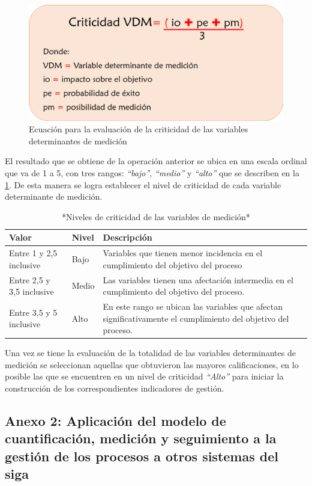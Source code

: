 \documentclass[
]{book}
\begin{document}
\begin{figure}

{\centering \includegraphics[width=0.6\linewidth]{Imagenes/texto_10} 

}

\caption{Ecuación para la evaluación de la criticidad de las variables determinantes de medición}\label{fig:texto10}
\end{figure}

El resultado que se obtiene de la operación anterior se ubica en una escala ordinal que va de 1 a 5, con tres rangos: \emph{``bajo''}, \emph{``medio''} y \emph{``alto''} que se describen en la \ref{tab:tablaD}. De esta manera se logra establecer el nivel de criticidad de cada variable determinante de medición.

\begin{table}

\caption{\label{tab:tablaD}*Niveles de criticidad de las variables de medición*}
\centering
\begin{tabular}[t]{l|l|l}
\hline
Valor & Nivel & Descripción\\
\hline
Entre 1 y 2,5 inclusive & Bajo & Variables que tienen menor incidencia en el cumplimiento del objetivo del proceso\\
\hline
Entre 2,5 y 3,5 inclusive & Medio & Las variables tienen una afectación intermedia en el cumplimiento del objetivo del proceso.\\
\hline
Entre 3,5 y 5 inclusive & Alto & En este rango se ubican las variables que afectan significativamente el cumplimiento del objetivo del proceso.\\
\hline
\end{tabular}
\end{table}

Una vez se tiene la evaluación de la totalidad de las variables determinantes de medición se seleccionan aquellas que obtuvieron las mayores calificaciones, en lo posible las que se encuentren en un nivel de criticidad \emph{``Alto''} para iniciar la construcción de los correspondientes indicadores de gestión.

\hypertarget{anexo-2-aplicaciuxf3n-del-modelo-de-cuantificaciuxf3n-mediciuxf3n-y-seguimiento-a-la-gestiuxf3n-de-los-procesos-a-otros-sistemas-del-siga}{%
\subsection{Anexo 2: Aplicación del modelo de cuantificación, medición y seguimiento a la gestión de los procesos a otros sistemas del siga}\label{anexo-2-aplicaciuxf3n-del-modelo-de-cuantificaciuxf3n-mediciuxf3n-y-seguimiento-a-la-gestiuxf3n-de-los-procesos-a-otros-sistemas-del-siga}}
\end{document}
